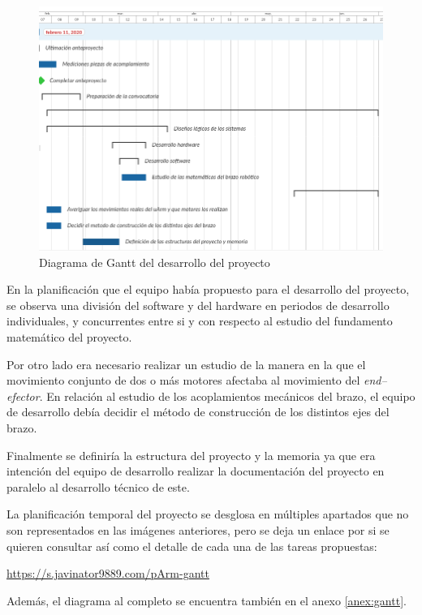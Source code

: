 \begin{figure}[H]
    \centering
    \includegraphics[width=1\linewidth]{pictures/DesarrolloProyecto.png}
    \caption{Diagrama de Gantt del desarrollo del proyecto}
    \label{fig:gantt_proyecto}
\end{figure}

En la planificación que el equipo había propuesto para el desarrollo del proyecto, se observa una división del software y del hardware en periodos de desarrollo individuales, y concurrentes entre si y con respecto al estudio del fundamento matemático del proyecto.

Por otro lado era necesario realizar un estudio de la manera en la que el movimiento conjunto de dos o más motores afectaba al movimiento del \textit{end--efector}. En relación al estudio de los acoplamientos mecánicos del brazo, el equipo de desarrollo debía decidir el método de construcción de los distintos ejes del brazo.

Finalmente se definiría la estructura del proyecto y la memoria ya que era intención del equipo de desarrollo realizar la documentación del proyecto en paralelo al desarrollo técnico de este.

La planificación temporal del proyecto se desglosa en múltiples apartados que no son
representados en las imágenes anteriores, pero se deja un enlace por si se quieren
consultar así como el detalle de cada una de las tareas propuestas:

\begin{center}
    \url{https://s.javinator9889.com/pArm-gantt} \qquad {}
\end{center}

Además, el diagrama al completo se encuentra también en el anexo \ref{anex:gantt}.
